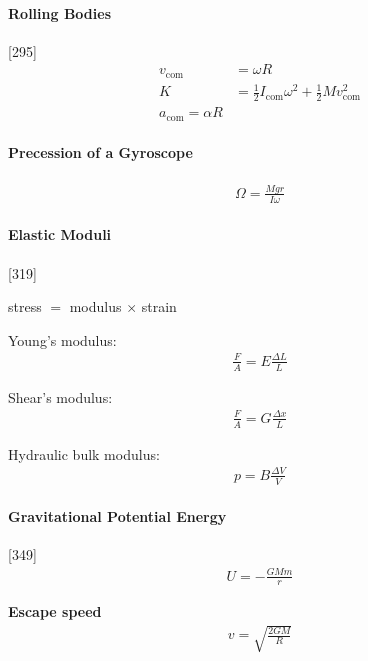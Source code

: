 \documentclass{article}
\numberwithin{equation}{subsection} %
\theoremstyle{definition}
\begin{document}
\paragraph{Rolling Bodies}
[295]
\begin{align}
    v_\text{com} &= \omega R\\
    K  &= \frac{1}{2}I_\text{com}\omega^2 + \frac{1}{2}Mv_\text{com}^2
    \\
    a_\text{com} = \alpha R
\end{align}
\paragraph{Precession of a Gyroscope}
\begin{align}
    \Omega = \frac{Mgr}{I\omega}
\end{align}

\paragraph{Elastic Moduli} [319]
\begin{center}
    stress $=$ modulus $\times$ strain
\end{center}

Young's modulus:
\begin{align}
    \frac{F}{A} = E \frac{\Delta L}{L}
\end{align}

Shear's modulus:
\begin{align}
    \frac{F}{A} = G \frac{\Delta x}{L}
\end{align}

Hydraulic bulk modulus:
\begin{align}
    p = B \frac{\Delta V}{V}
\end{align}

\paragraph{Gravitational Potential Energy} [349]
\begin{align}
    U = -\frac{GMm}{r}
\end{align}

\textbf{Escape speed}
\begin{align}
    v = \sqrt{ \frac{2GM}{R} }
\end{align}
\end{document}
